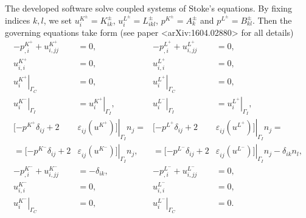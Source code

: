 \documentclass[12pt,a4paper]{article}
\newcommand{\str}[3]{\varepsilon^{#1}_{#2} \left( #3 \right)}
\begin{document}
The developed software solve coupled systems of Stoke's equations. By fixing indices $k,l$, we set $u_i^{K^{\pm}} = K^{\pm}_{ik}$, $u_i^{L^{\pm}} = L^{\pm}_{ikl}$, $p^{K^{\pm}} = A^{\pm}_{k}$ and $p^{L^{\pm}} = B^{\pm}_{kl}$. Then the governing equations take form (see paper <arXiv:1604.02880> for all details)
\begin{align}
- p^{K^{+}}_{,i} + u^{K^{+}}_{i,jj} & = 0, &  - p^{L^{+}}_{,i} + u^{L^{+}}_{i,jj} & = 0, \\
u^{K^{+}}_{i,i} & = 0, & u^{L^{+}}_{i,i} & = 0 , \\
\left. u^{K^{+}}_{i} \right|_{\Gamma_C} & = 0, & \left. u^{L^{+}}_{i} \right|_{\Gamma_C} & = 0, \\
\left. u^{K^{-}}_{i} \right|_{\Gamma_I} & = \left. u^{K^{+}}_{i} \right|_{\Gamma_I}, &  \left. u^{L^{-}}_{i} \right|_{\Gamma_I} & = \left. u^{L^{+}}_{i} \right|_{\Gamma_I},  \\
[ - p^{K^{+}} \delta_{ij} + 2 & \left. \str{}{ij}{u^{K^{+}}} ] \right|_{\Gamma_I} n_j = &  [ - p^{L^{+}} \delta_{ij} + 2 & \left. \str{}{ij}{u^{L^{+}}} ] \right|_{\Gamma_I} n_j = \\
= [ - p^{K^{-}} \delta_{ij} + 2 & \left. \str{}{ij}{u^{K^{-}}} ] \right|_{\Gamma_I} n_j,  &  = [ - p^{L^{-}} \delta_{ij} + 2 & \left. \str{}{ij}{u^{L^{-}}} ] \right|_{\Gamma_I} n_j - \delta_{ik} n_l,  \\
- p^{K^{-}}_{,i} + u^{K^{-}}_{i,jj} & = - \delta_{ik},  & - p^{L^{-}}_{,i} + u^{L^{-}}_{i,jj} & = 0,  \\
u^{K^{-}}_{i,i} & = 0, & u^{L^{-}}_{i,i} & = 0, \\
\left. u^{K^{-}}_{i} \right|_{\Gamma_C} & = 0, & \left. u^{L^{-}}_{i} \right|_{\Gamma_C} & = 0.
\end{align}
\end{document}
